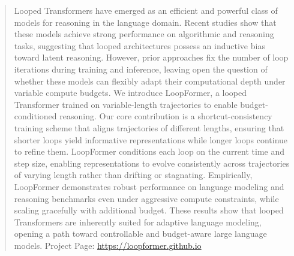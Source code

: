 
\hypersetup{
    colorlinks=true,
    urlcolor=customred  %
}

\begin{abstract}
Looped Transformers have emerged as an efficient and powerful class of models for reasoning in the language domain. Recent studies show that these models achieve strong performance on algorithmic and reasoning tasks, suggesting that looped architectures possess an inductive bias toward latent reasoning. However, prior approaches fix the number of loop iterations during training and inference, leaving open the question of whether these models can flexibly adapt their computational depth under variable compute budgets. We introduce LoopFormer, a looped Transformer trained on variable-length trajectories to enable budget-conditioned reasoning. Our core contribution is a shortcut-consistency training scheme that aligns trajectories of different lengths, ensuring that shorter loops yield informative representations while longer loops continue to refine them. LoopFormer conditions each loop on the current time and step size, enabling representations to evolve consistently across trajectories of varying length rather than drifting or stagnating. Empirically, LoopFormer demonstrates robust performance on language modeling and reasoning benchmarks even under aggressive compute constraints, while scaling gracefully with additional budget. These results show that looped Transformers are inherently suited for adaptive language modeling, opening a path toward controllable and budget-aware large language models. Project Page: \href{https://loopformer.github.io/}{\textcolor{customred}{https://loopformer.github.io}}
\end{abstract}